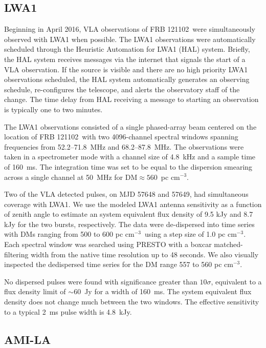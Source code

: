 \documentclass[twocolumn]{aastex61}
\newcommand{\frb}{FRB 121102}
\begin{document}
\subsection{LWA1}

Beginning in April 2016, VLA observations of \frb\ were simultaneously observed with LWA1 when possible.  The LWA1 observations were automatically scheduled through the Heuristic Automation for LWA1 (HAL) system.  Briefly, the HAL system receives messages via the internet that signals the start of a VLA observation. If the source is visible and there are no high priority LWA1 observations scheduled, the HAL system automatically generates an observing schedule, re-configures the telescope, and alerts the observatory staff of the change. The time delay from HAL receiving a message to starting an observation is typically one to two minutes.

The LWA1 observations consisted of a single phased-array beam centered on the location of \frb\ with two 4096-channel spectral windows spanning frequencies from 52.2--71.8~MHz and 68.2--87.8~MHz. The observations were taken in a spectrometer mode with a channel size of 4.8~kHz and a sample time of 160~ms. The integration time was set to be equal to the dispersion smearing across a single channel at 50~MHz for DM$\approx560$\ pc cm$^{-3}$. 

Two of the VLA detected pulses, on MJD 57648 and 57649, had simultaneous coverage with LWA1. We use the modeled LWA1 antenna sensitivity as a function of zenith angle to estimate an system equivalent flux density of 9.5 kJy and 8.7 kJy for the two bursts, respectively. The data were de-dispersed into time series with DMs ranging from 500 to 600 pc cm$^{-3}$\ using a step size of 1.0 pc cm$^{-3}$. Each spectral window was searched using PRESTO \citep{2001PhDT.......123R} with a boxcar matched-filtering width from the native time resolution up to 48 seconds. We also visually inspected the dedispersed time series for the DM range 557 to 560 pc cm$^{-3}$.

No dispersed pulses were found with significance greater than $10\sigma$, equivalent to a flux density limit of $\sim60$\ Jy for a width of 160~ms. The system equivalent flux density does not change much between the two windows. The effective sensitivity to a typical 2~ms pulse width is 4.8~kJy.

\subsection{AMI-LA}
\end{document}

